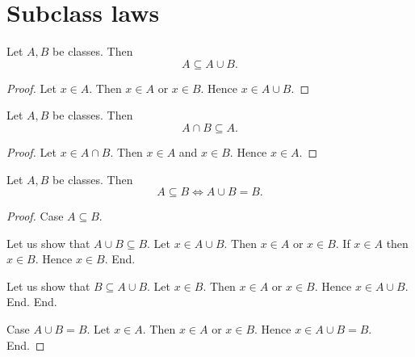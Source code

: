 \documentclass[../../set-theory/set-theory.tex]{subfiles}
\begin{document}
  \section*{Subclass laws}

  \begin{forthel}
    \begin{proposition}
      Let $A, B$ be classes.
      Then \[ A \subseteq A \cup B. \]
    \end{proposition}
    \begin{proof}
      Let $x \in A$.
      Then $x \in A$ or $x \in B$.
      Hence $x \in A \cup B$.
    \end{proof}
  \end{forthel}

  \begin{forthel}
    \begin{proposition}
      Let $A, B$ be classes.
      Then \[ A \cap B \subseteq A. \]
    \end{proposition}
    \begin{proof}
      Let $x \in A \cap B$.
      Then $x \in A$ and $x \in B$.
      Hence $x \in A$.
    \end{proof}
  \end{forthel}

  \begin{forthel}
    \begin{proposition}
      Let $A, B$ be classes.
      Then \[ A \subseteq B \iff A \cup B = B. \]
    \end{proposition}
    \begin{proof}
      Case $A \subseteq B$.

        Let us show that $A \cup B \subseteq B$.
          Let $x \in A \cup B$.
          Then $x \in A$ or $x \in B$.
          If $x \in A$ then $x \in B$.
          Hence $x \in B$.
        End.

        Let us show that $B \subseteq A \cup B$.
          Let $x \in B$.
          Then $x \in A$ or $x \in B$.
          Hence $x \in A \cup B$.
        End.
      End.

      Case $A \cup B = B$.
        Let $x \in A$.
        Then $x \in A$ or $x \in B$.
        Hence $x \in A \cup B = B$.
      End.
    \end{proof}
  \end{forthel}
\end{document}
